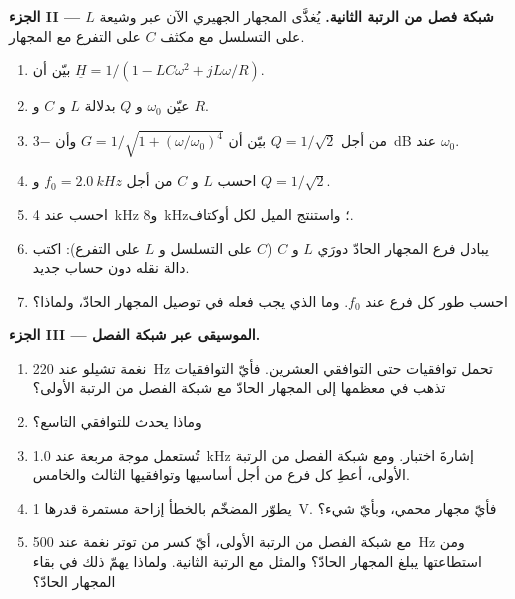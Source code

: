 \begin{problem}
\medskip
\noindent\textbf{الجزء II --- شبكة فصل من الرتبة الثانية.}
يُغذَّى المجهار الجهيري الآن عبر وشيعة $L$ على التسلسل مع مكثف $C$
على التفرع مع المجهار.
\begin{enumerate}[resume]
  \item بيّن أن $\underline H = 1/(1 - LC\omega^2 + jL\omega/R)$.
  \item عيّن $\omega_0$ و $Q$ بدلالة $L$ و $C$ و $R$.
  \item من أجل $Q = 1/\sqrt2$ بيّن أن $G = 1/\sqrt{1 + (\omega/\omega_0)^4}$
        وأن  \qty{-3}{dB} عند $\omega_0$.
  \item احسب $L$ و $C$ من أجل $f_0 = \qty{2.0}{kHz}$ و $Q = 1/\sqrt2$.
  \item احسب   عند \qty{4}{kHz} و\qty{8}{kHz}؛
        واستنتج الميل  لكل أوكتاف.
  \item يبادل فرع المجهار الحادّ دورَي $L$ و $C$ ($C$ على التسلسل و
        $L$ على التفرع): اكتب دالة نقله دون حساب
        جديد.
  \item احسب طور كل فرع عند $f_0$. وما الذي يجب فعله في
        توصيل المجهار الحادّ، ولماذا؟
\end{enumerate}

\medskip
\noindent\textbf{الجزء III --- الموسيقى عبر شبكة الفصل.}
\begin{enumerate}[resume]
  \item نغمة تشيلو عند \qty{220}{Hz} تحمل توافقيات حتى التوافقي العشرين.
        فأيّ التوافقيات تذهب في معظمها إلى المجهار الحادّ مع شبكة الفصل
        من الرتبة الأولى؟
  \item وماذا يحدث للتوافقي التاسع؟
  \item تُستعمل موجة مربعة عند \qty{1.0}{kHz} إشارةَ اختبار. ومع
        شبكة الفصل من الرتبة الأولى، أعطِ  كل فرع من أجل
        أساسيها وتوافقيها الثالث والخامس.
  \item يطوّر المضخّم بالخطأ إزاحة مستمرة قدرها \qty{1}{V}. فأيّ
        مجهار محمي، وبأيّ شيء؟
  \item مع شبكة الفصل من الرتبة الأولى، أيّ كسر من توتر نغمة عند
        \qty{500}{Hz} ومن استطاعتها يبلغ المجهار الحادّ؟
        والمثل مع الرتبة الثانية. ولماذا يهمّ ذلك
        في بقاء المجهار الحادّ؟
\end{enumerate}


\end{problem}
